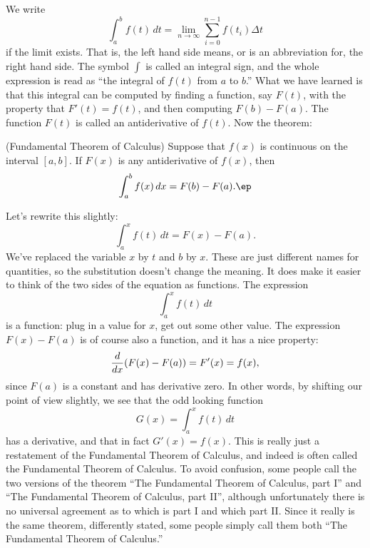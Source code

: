 We write
$$
  \int_a^b f(t)\,dt = \lim_{n\to\infty}\sum_{i=0}^{n-1} f(t_i)\Delta t
$$ 
if the limit exists. That is, the left hand side means, or is an
abbreviation for, the right hand side. The symbol $\int$ is called an
{\dfont integral sign\/}, and the whole
expression is read as ``the integral of $f(t)$ from $a$ to $b$.'' What
we have learned is that this integral can be computed by finding a
function, say $F(t)$, with the property that $F'(t)=f(t)$, and then
computing $F(b)-F(a)$. The function $F(t)$ is called an {\dfont
antiderivative\/} of $f(t)$. Now the theorem:

\begin{theorem} (Fundamental Theorem of Calculus) 
\label{thm:fundamental_theorem_I}
Suppose that $f(x)$ is
continuous on the interval $[a,b]$. If $F(x)$ is any antiderivative of
$f(x)$, then 
$$
  \int_a^b f(x)\,dx = F(b)-F(a).\ep
$$
\end{theorem}

Let's rewrite this slightly: 
$$
  \int_a^x f(t)\,dt = F(x)-F(a).
$$
We've replaced the variable $x$ by $t$ and $b$ by $x$. These are just
different names for quantities, so the substitution doesn't change the
meaning. It does make it easier to think of the two sides of the
equation as functions. The expression
$$
  \int_a^x f(t)\,dt
$$
is a function: plug in a value for $x$, get out some other value. The
expression $F(x)-F(a)$ is of course also a function, and it has a nice
property: 
$$
  {d\over dx} (F(x)-F(a)) = F'(x) = f(x),
$$
since $F(a)$ is a constant and has derivative zero. In other words, by
shifting our point of view slightly, we see that the odd looking
function
$$
  G(x)=\int_a^x f(t)\,dt
$$
has a derivative, and that in fact $G'(x)=f(x)$. This is really just a
restatement of the Fundamental Theorem of Calculus, and indeed is
often called the Fundamental Theorem of Calculus. To avoid confusion,
some people call the two versions of the theorem ``The Fundamental
Theorem of Calculus, part I'' and ``The Fundamental
Theorem of Calculus, part II'', although unfortunately there is no
universal agreement as to which is part I and which part II. Since it
really is the same theorem, differently stated, some people simply
call them both ``The Fundamental
Theorem of Calculus.''

